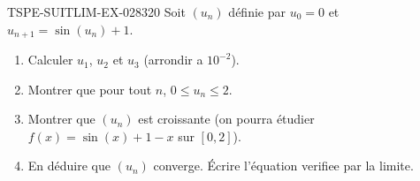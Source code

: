 \begin{exercice}{TSPE-SUITLIM-EX-028}{3}{20}
Soit $(u_n)$ définie par $u_0 = 0$ et $u_{n+1} = \sin(u_n) + 1$.
\begin{enumerate}
  \item Calculer $u_1$, $u_2$ et $u_3$ (arrondir a $10^{-2}$).
  \item Montrer que pour tout $n$, $0 \leq u_n \leq 2$.
  \item Montrer que $(u_n)$ est croissante (on pourra étudier $f(x) = \sin(x) + 1 - x$ sur $[0, 2]$).
  \item En déduire que $(u_n)$ converge. Écrire l'équation verifiee par la limite.
\end{enumerate}
\end{exercice}
